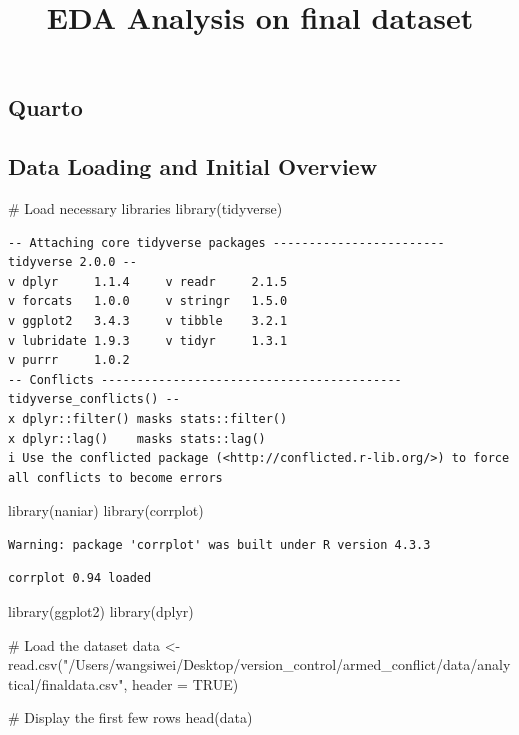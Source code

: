 \documentclass[
  letterpaper,
  DIV=11,
  numbers=noendperiod]{scrartcl}
\title{EDA Analysis on final dataset}
\author{}
\date{}
\newenvironment{Shaded}{\begin{snugshade}}{\end{snugshade}}
\newcommand{\AttributeTok}[1]{\textcolor[rgb]{0.40,0.45,0.13}{#1}}
\newcommand{\CommentTok}[1]{\textcolor[rgb]{0.37,0.37,0.37}{#1}}
\newcommand{\ConstantTok}[1]{\textcolor[rgb]{0.56,0.35,0.01}{#1}}
\newcommand{\FunctionTok}[1]{\textcolor[rgb]{0.28,0.35,0.67}{#1}}
\newcommand{\NormalTok}[1]{\textcolor[rgb]{0.00,0.23,0.31}{#1}}
\newcommand{\OtherTok}[1]{\textcolor[rgb]{0.00,0.23,0.31}{#1}}
\newcommand{\StringTok}[1]{\textcolor[rgb]{0.13,0.47,0.30}{#1}}
\begin{document}
\maketitle


\subsection{Quarto}\label{quarto}

\subsection{Data Loading and Initial
Overview}\label{data-loading-and-initial-overview}

\begin{Shaded}
\begin{Highlighting}[]
\CommentTok{\# Load necessary libraries}
\FunctionTok{library}\NormalTok{(tidyverse)}
\end{Highlighting}
\end{Shaded}

\begin{verbatim}
-- Attaching core tidyverse packages ------------------------ tidyverse 2.0.0 --
v dplyr     1.1.4     v readr     2.1.5
v forcats   1.0.0     v stringr   1.5.0
v ggplot2   3.4.3     v tibble    3.2.1
v lubridate 1.9.3     v tidyr     1.3.1
v purrr     1.0.2     
-- Conflicts ------------------------------------------ tidyverse_conflicts() --
x dplyr::filter() masks stats::filter()
x dplyr::lag()    masks stats::lag()
i Use the conflicted package (<http://conflicted.r-lib.org/>) to force all conflicts to become errors
\end{verbatim}

\begin{Shaded}
\begin{Highlighting}[]
\FunctionTok{library}\NormalTok{(naniar)}
\FunctionTok{library}\NormalTok{(corrplot)}
\end{Highlighting}
\end{Shaded}

\begin{verbatim}
Warning: package 'corrplot' was built under R version 4.3.3
\end{verbatim}

\begin{verbatim}
corrplot 0.94 loaded
\end{verbatim}

\begin{Shaded}
\begin{Highlighting}[]
\FunctionTok{library}\NormalTok{(ggplot2)}
\FunctionTok{library}\NormalTok{(dplyr)}

\CommentTok{\# Load the dataset}
\NormalTok{data }\OtherTok{\textless{}{-}} \FunctionTok{read.csv}\NormalTok{(}\StringTok{"/Users/wangsiwei/Desktop/version\_control/armed\_conflict/data/analytical/finaldata.csv"}\NormalTok{, }\AttributeTok{header =} \ConstantTok{TRUE}\NormalTok{)}

\CommentTok{\# Display the first few rows}
\FunctionTok{head}\NormalTok{(data)}
\end{Highlighting}
\end{Shaded}
\end{document}
